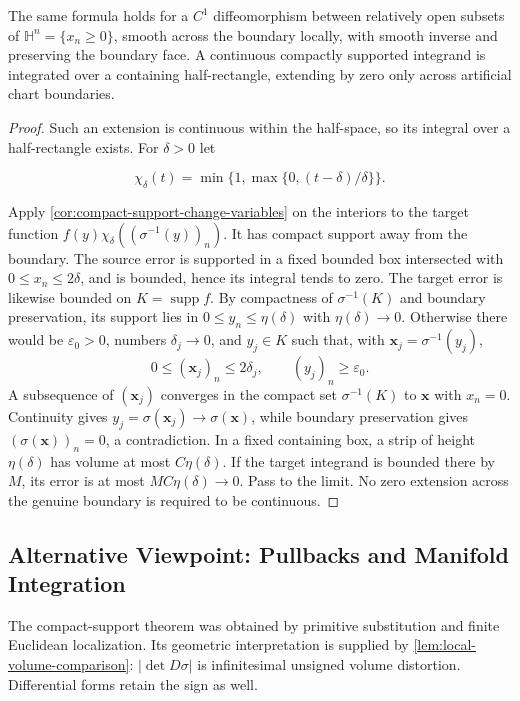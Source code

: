 \begin{corollary}
\label{cor:halfspace-change-variables}
The same formula holds for a $C^1$ diffeomorphism between relatively open
subsets of $\mathbb H^n=\{x_n\geq0\}$, smooth across the boundary locally,
with smooth inverse and preserving the boundary face. A continuous compactly
supported integrand is integrated over a containing half-rectangle, extending
by zero only across artificial chart boundaries.
\end{corollary}
\begin{proof}
Such an extension is continuous within the half-space, so its integral over
a half-rectangle exists. For $\delta>0$ let

\[
\chi_\delta(t)=\min\{1,\max\{0,(t-\delta)/\delta\}\}.
\]

Apply \cref{cor:compact-support-change-variables} on the interiors to the target function
$f(y)\chi_\delta((\sigma^{-1}(y))_n)$. It has compact support away from the
boundary. The source error is supported in a fixed bounded box intersected
with $0\leq x_n\leq2\delta$, and is bounded, hence its integral tends to zero.
The target error is likewise bounded on $K=\operatorname{supp}f$.
By compactness of $\sigma^{-1}(K)$ and boundary preservation, its support
lies in $0\leq y_n\leq\eta(\delta)$ with $\eta(\delta)\to0$.
Otherwise there would be $\varepsilon_0>0$, numbers $\delta_j\to0$, and
$y_j\in K$ such that, with $\mathbf{x}_j=\sigma^{-1}(y_j)$,
\[
0\leq(\mathbf{x}_j)_n\leq2\delta_j,
\qquad (y_j)_n\geq\varepsilon_0.
\]
A subsequence of $(\mathbf{x}_j)$ converges in the compact set $\sigma^{-1}(K)$ to
$\mathbf{x}$ with $x_n=0$. Continuity gives $y_j=\sigma(\mathbf{x}_j)\to\sigma(\mathbf{x})$, while boundary
preservation gives $(\sigma(\mathbf{x}))_n=0$, a contradiction. In a fixed containing
box, a strip of height $\eta(\delta)$ has volume at most
$C\eta(\delta)$. If the target integrand is bounded there by $M$, its error
is at most $MC\eta(\delta)\to0$. Pass to the limit. No zero extension across the
genuine boundary is required to be continuous.
\end{proof}

\subsection{Alternative Viewpoint: Pullbacks and Manifold Integration}
\label{subsec:change-variables-forms}

The compact-support theorem was obtained by primitive substitution and
finite Euclidean localization. Its geometric interpretation is supplied by
\cref{lem:local-volume-comparison}: $|\det D\sigma|$ is infinitesimal
unsigned volume distortion. Differential forms retain the sign as well.

